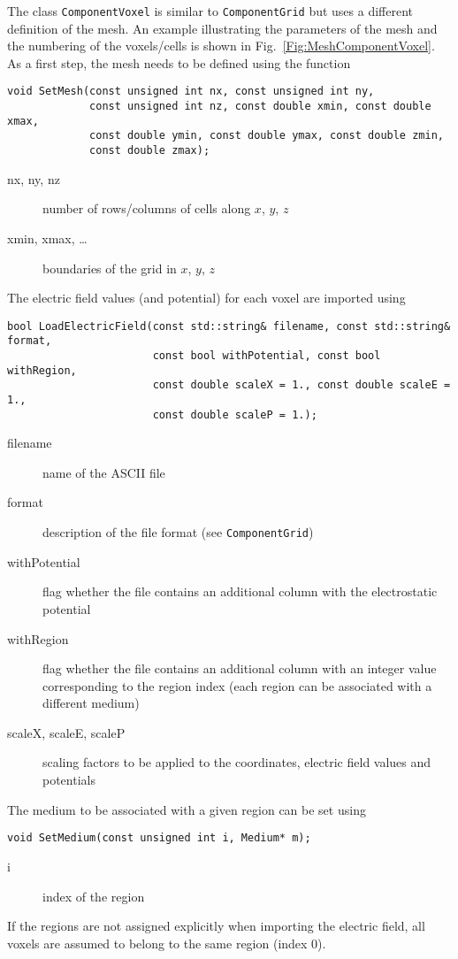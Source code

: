 The class \texttt{ComponentVoxel} is similar to \texttt{ComponentGrid} 
but uses a different definition of the mesh. 
An example illustrating the parameters of the mesh and the numbering of 
the voxels/cells is shown in Fig.~\ref{Fig:MeshComponentVoxel}.
As a first step, the mesh needs to be defined using the function
\begin{lstlisting}
void SetMesh(const unsigned int nx, const unsigned int ny,
             const unsigned int nz, const double xmin, const double xmax,
             const double ymin, const double ymax, const double zmin,
             const double zmax);
\end{lstlisting}
\begin{description}
  \item[nx, ny, nz] 
  number of rows/columns of cells along $x$, $y$, $z$
  \item[xmin, xmax, \dots] 
  boundaries of the grid in $x$, $y$, $z$
\end{description}
The electric field values (and potential) for each voxel are imported using 
\begin{lstlisting}
bool LoadElectricField(const std::string& filename, const std::string& format,
                       const bool withPotential, const bool withRegion,
                       const double scaleX = 1., const double scaleE = 1.,
                       const double scaleP = 1.);
\end{lstlisting}
\begin{description}
  \item[filename]
  name of the ASCII file
  \item[format]
  description of the file format (see \texttt{ComponentGrid})
  \item[withPotential]
  flag whether the file contains an additional column with the electrostatic potential
  \item[withRegion]
  flag whether the file contains an additional column with an integer value 
  corresponding to the region index (each region can be associated with a different medium)
  \item[scaleX, scaleE, scaleP]
  scaling factors to be applied to the coordinates, electric field values 
  and potentials 
\end{description}
The medium to be associated with a given region can be set using
\begin{lstlisting}
void SetMedium(const unsigned int i, Medium* m);
\end{lstlisting}
\begin{description}
  \item[i] index of the region
\end{description}
If the regions are not assigned explicitly when importing the electric field, 
all voxels are assumed to belong to the same region (index 0).

